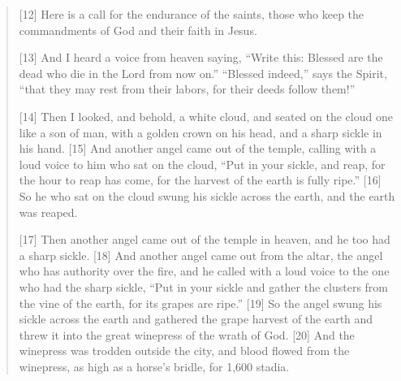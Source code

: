 \begin{quote}
    [12] Here is a call for the endurance of the saints, those who keep the
    commandments of God and their faith in Jesus.

    [13] And I heard a voice from heaven saying, “Write this: Blessed are the
    dead who die in the Lord from now on.” “Blessed indeed,” says the Spirit,
    “that they may rest from their labors, for their deeds follow them!”

    [14] Then I looked, and behold, a white cloud, and seated on the cloud
    one like a son of man, with a golden crown on his head, and a sharp
    sickle in his hand.  [15] And another angel came out of the temple,
    calling with a loud voice to him who sat on the cloud, “Put in your
    sickle, and reap, for the hour to reap has come, for the harvest of the
    earth is fully ripe.” [16] So he who sat on the cloud swung his sickle
    across the earth, and the earth was reaped.

    [17] Then another angel came out of the temple in heaven, and he too had
    a sharp sickle.  [18] And another angel came out from the altar, the
    angel who has authority over the fire, and he called with a loud voice to
    the one who had the sharp sickle, “Put in your sickle and gather the
    clusters from the vine of the earth, for its grapes are ripe.” [19] So
    the angel swung his sickle across the earth and gathered the grape
    harvest of the earth and threw it into the great winepress of the wrath
    of God.  [20] And the winepress was trodden outside the city, and blood
    flowed from the winepress, as high as a horse’s bridle, for 1,600 stadia.
  \end{quote}
